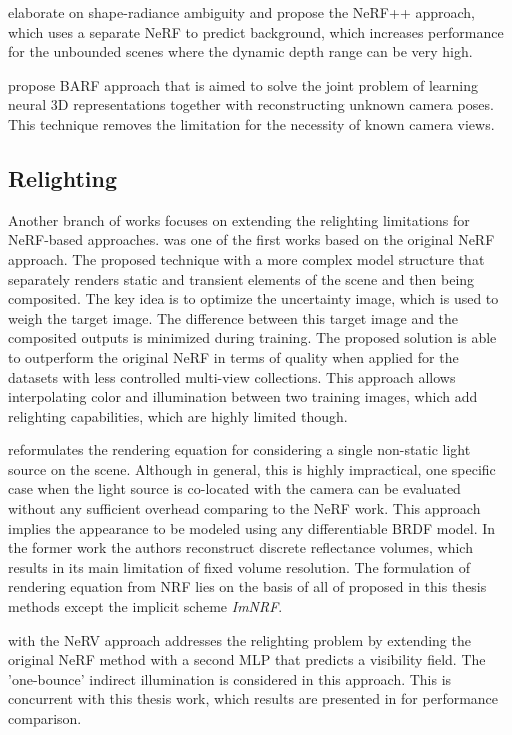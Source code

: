 \cite{zhang2020nerf} elaborate on shape-radiance ambiguity
and propose the NeRF++ approach, which uses a separate NeRF to predict background,
which increases performance for the unbounded scenes where the dynamic depth range can be very high.

\cite{lin2021barf} propose BARF approach that is aimed to solve the joint problem
of learning neural 3D representations together with reconstructing unknown camera poses.
This technique removes the limitation for the necessity of known camera views.

\subsection{Relighting}

Another branch of works focuses on extending the relighting limitations for NeRF-based approaches.
\cite{martinbrualla2021nerfw} was one of the first works based on the original NeRF approach.
The proposed technique with a more complex model structure
that separately renders static and transient elements of the scene
and then being composited.
The key idea is to optimize the uncertainty image, which is used to weigh the target image.
The difference between this target image and the composited outputs is minimized during training.
The proposed solution is able to outperform the original NeRF in terms of quality
when applied for the datasets with less controlled multi-view collections.
This approach allows interpolating color and illumination between two training images,
which add relighting capabilities, which are highly limited though.

\cite{bi2020neural} reformulates the rendering equation for considering a single non-static light source on the scene.
Although in general, this is highly impractical, one specific case
when the light source is co-located with the camera can be evaluated
without any sufficient overhead comparing to the NeRF work.
This approach implies the appearance to be modeled using any differentiable BRDF model.
In the former work \cite{bi2020deep} the authors reconstruct discrete reflectance volumes,
which results in its main limitation of fixed volume resolution.
The formulation of rendering equation from NRF
lies on the basis of all of proposed in this thesis methods except the implicit scheme \textit{ImNRF}.

\cite{nerv2021} with the NeRV approach addresses the relighting problem
by extending the original NeRF method with a second MLP
that predicts a visibility field.
The 'one-bounce' indirect illumination is considered in this approach.
This is concurrent with this thesis work, which results are presented in  for performance comparison.

